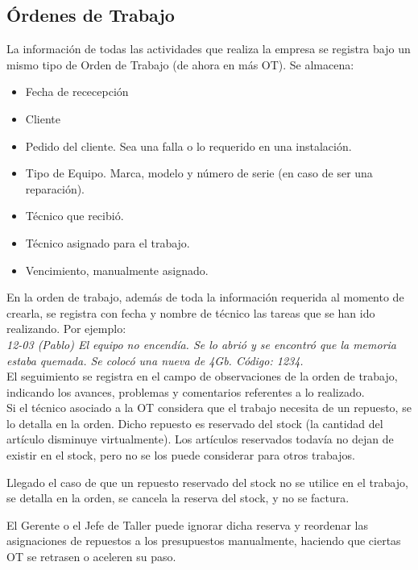\documentclass[12pt]{extarticle}
\begin{document}
\begin{spacing}{1.2}
        \pagebreak
        \subsection{Órdenes de Trabajo}
        La información de todas las actividades que realiza la empresa se registra bajo un mismo tipo de Orden de Trabajo (de ahora en más OT).
        Se almacena:
        \begin{itemize}
            \item Fecha de rececepción
            \item Cliente
            \item Pedido del cliente. Sea una falla o lo requerido en una instalación.
            \item Tipo de Equipo. Marca, modelo y número de serie (en caso de ser una reparación).
            \item Técnico que recibió. 
            \item Técnico asignado para el trabajo.
            \item Vencimiento, manualmente asignado.
        \end{itemize}

        En la orden de trabajo, además de toda la información requerida al momento de crearla, se registra con fecha y nombre de técnico las tareas que se han ido realizando.
        Por ejemplo:\\ 
        \textit{
        12-03 (Pablo) El equipo no encendía. Se lo abrió y se encontró que la memoria estaba quemada. Se colocó una nueva de 4Gb. Código: 1234.
        }\\

        El seguimiento se registra en el campo de observaciones de la orden de trabajo, indicando los avances, problemas y comentarios referentes a lo realizado.\\

        Si el técnico asociado a la OT considera que el trabajo necesita de un repuesto, se lo detalla en la orden. Dicho repuesto es reservado del stock (la cantidad del artículo disminuye virtualmente). Los artículos reservados todavía no dejan de existir en el stock, pero no se los puede considerar para otros trabajos. 

        Llegado el caso de que un repuesto reservado del stock no se utilice en el trabajo, se detalla en la orden, se cancela la reserva del stock, y no se factura.

        El Gerente o el Jefe de Taller puede ignorar dicha reserva y reordenar las asignaciones de repuestos a los presupuestos manualmente, haciendo que ciertas OT se retrasen o aceleren su paso.


\end{spacing}
\end{document}
